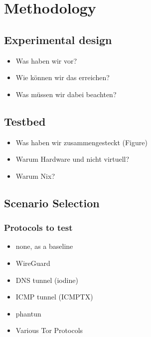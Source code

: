 
\chapter{Methodology}
\label{chap:methodology}

\section{Experimental design}
\begin{itemize}
  \item Was haben wir vor?
  \item Wie können wir das erreichen?
  \item Was müssen wir dabei beachten?
\end{itemize}

\section{Testbed}
\begin{itemize}
  \item Was haben wir zusammengesteckt (Figure)
  \item Warum Hardware und nicht virtuell?
  \item Warum Nix?
\end{itemize}

\section{Scenario Selection}
\subsection{Protocols to test}
\begin{itemize}
  \item none, as a baseline
  \item WireGuard
  \item DNS tunnel (iodine)
  \item ICMP tunnel (ICMPTX)
  \item phantun
  \item Various Tor Protocols
\end{itemize}


